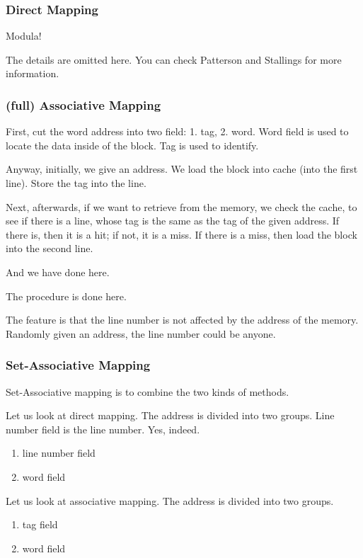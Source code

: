 \documentclass[11pt]{article}
\begin{document}
\subsubsection{Direct Mapping}
\label{sec:orgb0c7320}

Modula!

The details are omitted here. You can check Patterson and Stallings for more information.

\subsubsection{(full) Associative Mapping}
\label{sec:org8df73e9}

First, cut the word address into two field: 1. tag, 2. word. Word field is used to locate the data inside of the block. Tag is used to identify.

Anyway, initially, we give an address. We load the block into cache (into the first line). Store the tag into the line. 

Next, afterwards, if we want to retrieve from the memory, we check the cache, to see if there is a line, whose tag is the same as the tag of the given address. If there is, then it is a hit; if not, it is a miss. If there is a miss, then load the block into the second line.

And we have done here.

The procedure is done here.

The feature is that the line number is not affected by the address of the memory. Randomly given an address, the line number could be anyone.

\subsubsection{Set-Associative Mapping}
\label{sec:org604113f}

Set-Associative mapping is to combine the two kinds of methods. 

Let us look at direct mapping. The address is divided into two groups. Line number field is the line number. Yes, indeed.
\begin{enumerate}
\item line number field
\item word field
\end{enumerate}

Let us look at associative mapping. The address is divided into two groups. 
\begin{enumerate}
\item tag field
\item word field
\end{enumerate}
\end{document}
